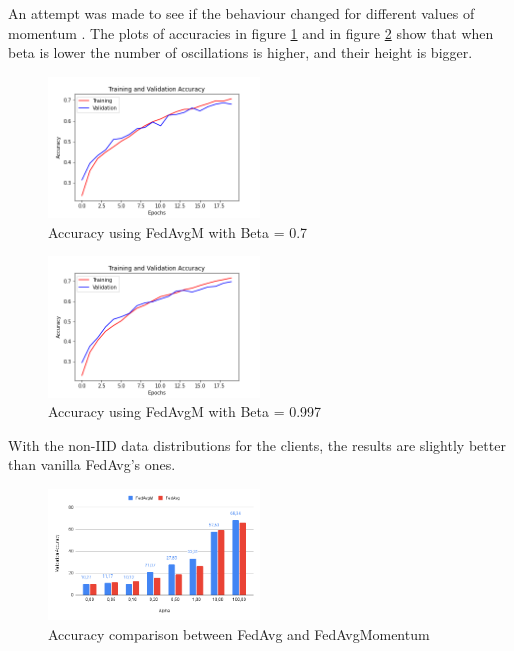 \documentclass[twocolumn]{article}
\begin{document}
An attempt was made to see if the behaviour changed for different values of momentum . The plots of accuracies in figure \ref{AccFedAvgB0.7} and in figure \ref{AccFedAvgB0.997} show that when beta is lower the number of oscillations is higher, and their height is bigger.
\begin{figure}
    \centering
    \includegraphics[width=0.5\textwidth,height=.3\textheight]{5_AccuracyFedAvgM_Beta0.7.png}
    \caption{Accuracy using FedAvgM with Beta = 0.7}
     \label{AccFedAvgB0.7} 
\end{figure}

\begin{figure}
    \centering
    \includegraphics[width=0.5\textwidth,height=.3\textheight]{5_AccuracyFedAvgM_Beta0.997.png}
    \caption{Accuracy using FedAvgM with Beta = 0.997}
     \label{AccFedAvgB0.997} 
\end{figure}

With the non-IID data distributions for the clients, the results are slightly better than vanilla FedAvg's ones. 

\begin{figure}
    \centering
    \includegraphics[width=0.5\textwidth,height=.3\textheight]{FedAvgMvsFedAvg.png}
    \caption{Accuracy comparison between FedAvg and FedAvgMomentum}
    \label{FedAvgvsFedM} 
\end{figure}
\end{document}

